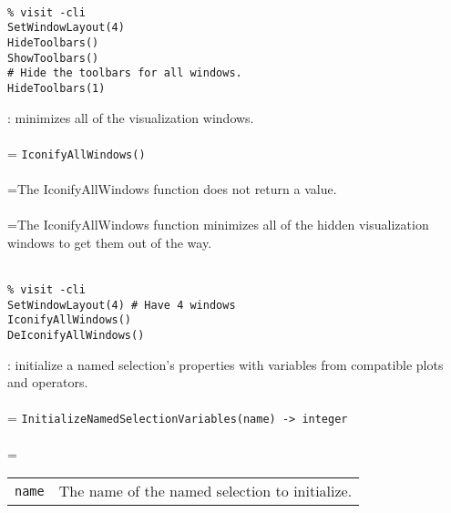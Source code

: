 \documentclass[10pt,a4paper]{report}
\begin{document}
\\[-6mm]
\begin{verbatim}% visit -cli
SetWindowLayout(4)
HideToolbars()
ShowToolbars()
# Hide the toolbars for all windows.
HideToolbars(1)
\end{verbatim}
\newpage


{}
: minimizes all of the visualization windows.\\[-3mm]

 \\ 
\hangindent=\parindent 
\verb!IconifyAllWindows()!\\ [-3mm]

 \\ 
\hangindent=\parindent The IconifyAllWindows function does not return a value. \\[-3mm] 

 \\ 
\hangindent=\parindent The IconifyAllWindows function minimizes all of the hidden visualization windows to get them out of the way. \\[-3mm] 

\\[-6mm]
\begin{verbatim}% visit -cli
SetWindowLayout(4) # Have 4 windows
IconifyAllWindows()
DeIconifyAllWindows()
\end{verbatim}
\newpage


{}
: initialize a named selection's properties with variables from compatible plots and operators.\\[-3mm]

 \\ 
\hangindent=\parindent 
\verb!InitializeNamedSelectionVariables(name) -> integer!\\ [-3mm]

 \\ 
\hangindent=\parindent 
\begin{tabular}{lp{9cm}}
\verb!name! & The name of the named selection to initialize. \\
\end{tabular} \\[-2mm]
\end{document}
